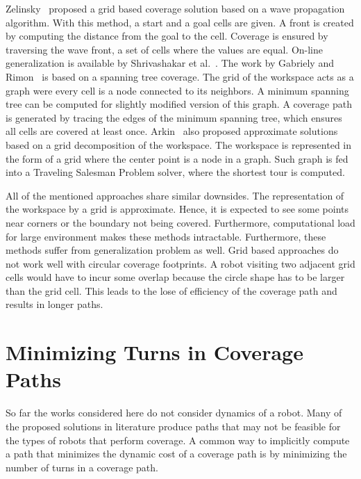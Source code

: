\documentclass[../main.tex]{subfiles}
\begin{document}
Zelinsky~\cite{Zelinsky1993planning} proposed a grid based coverage solution based on a wave propagation algorithm. With this method, a start and a goal cells are given. A front is created by computing the distance from the goal to the cell. Coverage is ensured by traversing the wave front, a set of cells where the values are equal. On-line generalization is available by Shrivashakar et al.~\cite{shivashankar2011real}. The work by Gabriely and Rimon~\cite{Gabriely2001spanning} is based on a spanning tree coverage. The grid of the workspace acts as a graph were every cell is a node connected to its neighbors. A minimum spanning tree can be computed for slightly modified version of this graph. A coverage path is generated by tracing the edges of the minimum spanning tree, which ensures all cells are covered at least once. Arkin~\cite{arkin2000approximation} also proposed approximate solutions based on a grid decomposition of the workspace. The workspace is represented in the form of a grid where the center point is a node in a graph. Such graph is fed into a Traveling Salesman Problem solver, where the shortest tour is computed.

All of the mentioned approaches share similar downsides. The representation of the workspace by a grid is approximate. Hence, it is expected to see some points near corners or the boundary not being covered. Furthermore, computational load for large environment makes these methods intractable. Furthermore, these methods suffer from generalization problem as well. Grid based approaches do not work well with circular coverage footprints. A robot visiting two adjacent grid cells would have to incur some overlap because the circle shape has to be larger than the grid cell. This leads to the lose of efficiency of the coverage path and results in longer paths.


\section{Minimizing Turns in Coverage Paths}
\label{section:minimizing_turns_in_coverage_paths}

So far the works considered here do not consider dynamics of a robot. Many of the proposed solutions in literature produce paths that may not be feasible for the types of robots that perform coverage. A common way to implicitly compute a path that minimizes the dynamic cost of a coverage path is by minimizing the number of turns in a coverage path. 
\end{document}
